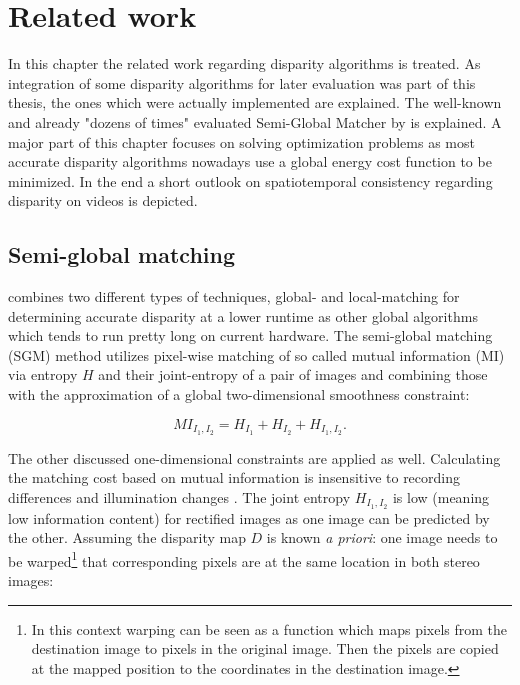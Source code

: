 \chapter{Related work}
\label{chap:related}

In this chapter the related work regarding disparity algorithms is treated.
As integration of some disparity algorithms for later evaluation was part of this thesis, the ones which were actually implemented are explained.
The well-known and already "dozens of times" evaluated Semi-Global Matcher by \citeauthor{hirschmuller2011semi} is explained.
A major part of this chapter focuses on solving optimization problems as most accurate disparity algorithms nowadays use a global energy cost function to be minimized.
In the end a short outlook on spatiotemporal consistency regarding disparity on videos is depicted.

\section{Semi-global matching}

\citeauthor{hirschmuller2011semi} combines two different types of techniques, global- and local-matching for determining accurate disparity at a lower runtime as other global algorithms which tends to run pretty long on current hardware.
\newline\newline\noindent The semi-global matching (SGM) method utilizes pixel-wise matching of so called mutual information (MI) via entropy $H$ and their joint-entropy of a pair of images and combining those with the approximation of a global two-dimensional smoothness constraint:

\begin{equation}
  MI_{I_1,I_2} = H_{I_1} + H_{I_2} + H_{I_1,I_2}.
\end{equation}

\noindent The other discussed one-dimensional constraints are applied as well.
Calculating the matching cost based on mutual information is insensitive to recording differences and illumination changes \citep{viola1997alignment}.
The joint entropy $H_{I_1,I_2}$ is low (meaning low information content) for rectified images as one image can be predicted by the other.
Assuming the disparity map $D$ is known \textit{a priori}: one image needs to be warped\footnote{In this context warping can be seen as a function which  maps pixels from the destination image to pixels in the original image. Then the pixels are copied at the mapped position to the coordinates in the destination image.} that corresponding pixels are at the same location in both stereo images:


